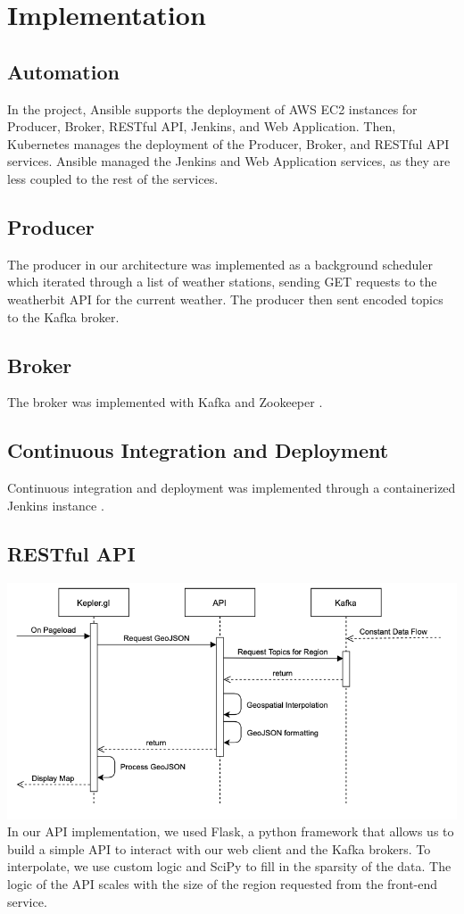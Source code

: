 \section{Implementation}
\subsection{Automation}
In the project, Ansible \cite{ansible} supports the deployment of AWS EC2 instances for Producer, Broker, RESTful API, Jenkins, and Web Application.
Then, Kubernetes \cite{kube} manages the deployment of the Producer, Broker, and RESTful API services.
Ansible managed the Jenkins and Web Application services, as they are less coupled to the rest of the services. 

\subsection{Producer}
The producer in our architecture was implemented as a background scheduler which iterated through a list of weather stations,
sending GET requests to the weatherbit API for the current weather. 
The producer then sent encoded topics to the Kafka broker.

\subsection{Broker}
The broker was implemented with Kafka \cite{kreps2011kafka} and Zookeeper \cite{hunt2010zookeeper}.

\subsection{Continuous Integration and Deployment}
Continuous integration and deployment was implemented through a containerized Jenkins instance \cite{jenkins}.

\subsection{RESTful API}
\includegraphics[width=\linewidth]{figures/Frontend_Flow.png}
In our API implementation, we used Flask, a python framework that allows us to build a simple API to interact with our web client and the Kafka brokers.
To interpolate, we use custom logic and SciPy to fill in the sparsity of the data.
The logic of the API scales with the size of the region requested from the front-end service.

